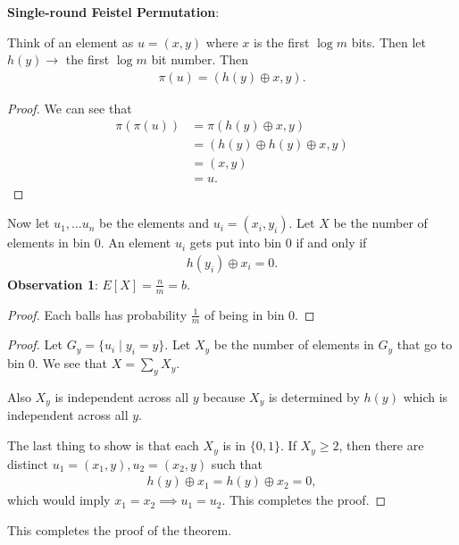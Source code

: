 \documentclass{report}
\begin{document}
\noindent \textbf{Single-round Feistel Permutation}:

\noindent Think of an element as $u = (x,y )$ where $x$ is the first $\log m$ bits. Then let $h(y) \to $ the first $\log m$ bit number. Then 
\begin{align*}
    \pi(u) = (h(y) \oplus x, y).
\end{align*}
\begin{proof}
    We can see that 
    \begin{align*}
        \pi(\pi(u)) &= \pi(h(y) \oplus x, y) \\
        &= (h(y) \oplus h(y) \oplus x, y) \\
        &= (x, y) \\
        &=u.
    \end{align*}
\end{proof}
Now let $u_1, \ldots u_n$ be the elements and $u_i = (x_i, y_i)$. Let $X$ be the number of elements in bin 0. An element $u_i $ gets put into bin 0 if and only if 
\begin{align*}
    h(y_i) \oplus x_i = 0.
\end{align*}
\textbf{Observation 1}: $E[X] = \frac nm = b$.
\begin{proof}
    Each balls has probability $\frac 1m$ of being in bin 0.
\end{proof}
\begin{proof}
    Let $G_y = \{u_i \mid y_i = y\}$. Let $X_y$ be the number of elements in $G_y$ that go to bin 0. We see that $X = \sum_{y}X_y$. 

    Also $X_y$ is independent across all $y$ because $X_y$ is determined by $h(y)$ which is independent across all $y$. 

    The last thing to show is that each $X_y$ is in $\{0, 1\}$. If $X_y \geq 2$, then there are distinct $u_1 = (x_1, y), u_2 = (x_2, y)$ such that 
    \begin{align*}
        h(y) \oplus x_1 = h(y) \oplus x_2 = 0,
    \end{align*}
    which would imply $x_1 = x_2 \implies u_1 = u_2$. This completes the proof. 
\end{proof}
This completes the proof of the theorem.

\end{document}
